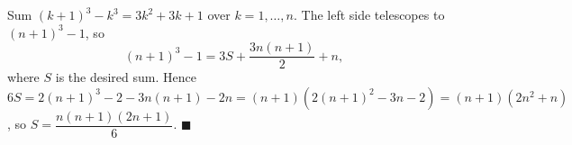 Sum $(k+1)^3-k^3=3k^2+3k+1$ over $k=1,\dots,n$. The left side telescopes to $(n+1)^3-1$, so
\[(n+1)^3-1=3S+\dfrac{3n(n+1)}{2}+n,\]
where $S$ is the desired sum. Hence $6S=2(n+1)^3-2-3n(n+1)-2n=(n+1)\left(2(n+1)^2-3n-2\right)=(n+1)\left(2n^2+n\right)$, so $S=\dfrac{n(n+1)(2n+1)}{6}$. $\blacksquare$
